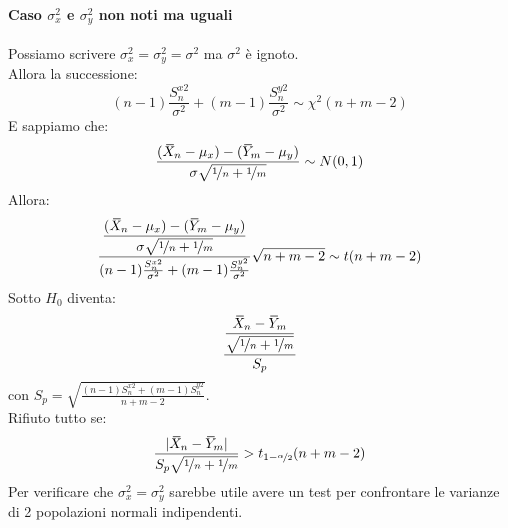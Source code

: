 \documentclass[12pt]{report}
\newcommand{\wbar}[1]{%
	\accentset{\mbox{\rule{0.55em}{0.5pt}}}{#1}%
}
\begin{document}
		\paragraph{Caso $\sigma^2_x$ e $\sigma^2_y$ non noti ma uguali}
		Possiamo scrivere $\sigma^2_x = \sigma^2_y = \sigma^2$ ma $\sigma^2$ è ignoto.\\
		Allora la successione:
		\[
		(n-1)\frac{S_n^{x2}}{\sigma^2} + (m-1)\frac{S_n^{y2}}{\sigma^2} \sim \chi^2(n+m-2)
		\]
		E sappiamo che:
		\[
		\frac{(\wbar{X}_n - \mu_x) - (\wbar{Y}_m - \mu_y)}{\sigma\sqrt{\nicefrac{1}{n} + \nicefrac{1}{m}}} \sim N(0, 1)
		\]
		Allora:
		\[
		\dfrac{\dfrac{(\wbar{X}_n - \mu_x) - (\wbar{Y}_m - \mu_y)}{\sigma\sqrt{\nicefrac{1}{n} + \nicefrac{1}{m}}}}{(n-1)\frac{S_n^{x2}}{\sigma^2} + (m-1)\frac{S_n^{y2}}{\sigma^2}}\sqrt{n+m-2} \sim t(n + m - 2)
		\]
		Sotto $H_0$ diventa:
		\[
\dfrac{\dfrac{\wbar{X}_n - \wbar{Y}_m}{\sqrt{\nicefrac{1}{n} + \nicefrac{1}{m}}}}{S_p}
		\]
		con $S_p = \sqrt{\frac{(n-1)S_n^{x2} + (m-1)S_n^{y2}}{n+m-2}}$. \\
		Rifiuto tutto se:
		\[
		\frac{|\wbar{X}_n - \wbar{Y}_m|}{S_p\sqrt{\nicefrac{1}{n} + \nicefrac{1}{m}}} > t_{1 - \nicefrac{\alpha}{2}}(n+m-2)
		\]
		Per verificare che $\sigma_x^2= \sigma_y^2$ sarebbe utile avere un test per confrontare le varianze di 2 popolazioni normali indipendenti.
\end{document}
